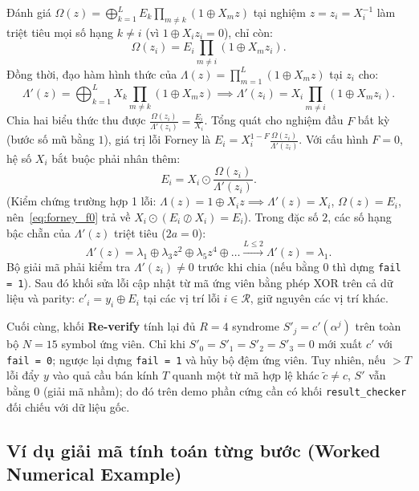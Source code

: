 Đánh giá $\Omega(z) = \bigoplus_{k=1}^{L} E_k \prod_{m \neq k} (1 \oplus X_m z)$ tại nghiệm $z = z_i = X_i^{-1}$ làm triệt tiêu mọi số hạng $k \neq i$ (vì $1 \oplus X_i z_i = 0$), chỉ còn:
\begin{equation}
\Omega(z_i) = E_i \prod_{m \neq i} (1 \oplus X_m z_i).
\end{equation}
Đồng thời, đạo hàm hình thức của $\Lambda(z) = \prod_{m=1}^{L}(1 \oplus X_m z)$ tại $z_i$ cho:
\begin{equation}
\Lambda'(z) = \bigoplus_{k=1}^{L} X_k \prod_{m \neq k} (1 \oplus X_m z) \implies \Lambda'(z_i) = X_i \prod_{m \neq i} (1 \oplus X_m z_i).
\end{equation}
Chia hai biểu thức thu được $\frac{\Omega(z_i)}{\Lambda'(z_i)} = \frac{E_i}{X_i}$. Tổng quát cho nghiệm đầu $F$ bất kỳ (bước số mũ bằng $1$), giá trị lỗi Forney là $E_i = X_i^{1-F} \frac{\Omega(z_i)}{\Lambda'(z_i)}$. Với cấu hình $F = 0$, hệ số $X_i$ bắt buộc phải nhân thêm:
\begin{equation}
E_i = X_i \odot \frac{\Omega(z_i)}{\Lambda'(z_i)}.
\label{eq:forney_f0}
\end{equation}
(Kiểm chứng trường hợp 1 lỗi: $\Lambda(z)=1 \oplus X_i z \implies \Lambda'(z)=X_i$, $\Omega(z)=E_i$, nên~\eqref{eq:forney_f0} trả về $X_i \odot (E_i \oslash X_i) = E_i$). Trong đặc số $2$, các số hạng bậc chẵn của $\Lambda'(z)$ triệt tiêu ($2a = 0$):
\begin{equation}
\Lambda'(z) = \lambda_1 \oplus \lambda_3 z^2 \oplus \lambda_5 z^4 \oplus \dots \xrightarrow{L \le 2} \Lambda'(z) = \lambda_1.
\end{equation}
Bộ giải mã phải kiểm tra $\Lambda'(z_i) \neq 0$ trước khi chia (nếu bằng $0$ thì dựng \texttt{fail = 1}). Sau đó khối sửa lỗi cập nhật từ mã ứng viên bằng phép XOR trên cả dữ liệu và parity: $c'_i = y_i \oplus E_i$ tại các vị trí lỗi $i \in \mathcal{R}$, giữ nguyên các vị trí khác.

Cuối cùng, khối \textbf{Re-verify} tính lại đủ $R = 4$ syndrome $S'_j = c'(\alpha^j)$ trên toàn bộ $N = 15$ symbol ứng viên. Chỉ khi $S'_0 = S'_1 = S'_2 = S'_3 = 0$ mới xuất $c'$ với \texttt{fail = 0}; ngược lại dựng \texttt{fail = 1} và hủy bộ đệm ứng viên. Tuy nhiên, nếu $>T$ lỗi đẩy $y$ vào quả cầu bán kính $T$ quanh một từ mã hợp lệ khác $\tilde{c} \neq c$, $S'$ vẫn bằng $0$ (giải mã nhầm); do đó trên demo phần cứng cần có khối \texttt{result\_checker} đối chiếu với dữ liệu gốc.

\subsection{Ví dụ giải mã tính toán từng bước (Worked Numerical Example)}

